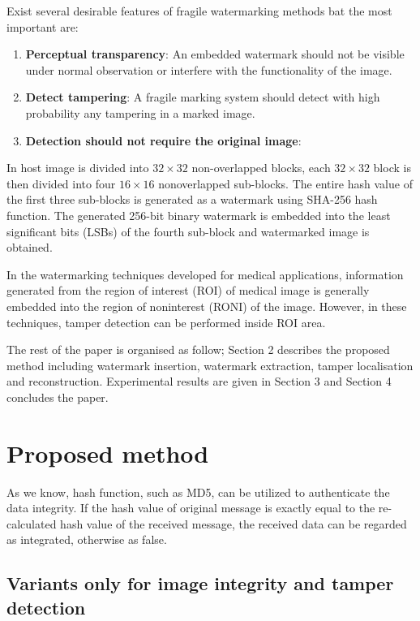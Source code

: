 \documentclass[runningheads]{llncs}
\begin{document}
Exist several desirable features of fragile watermarking methods bat the most important are:

\begin{enumerate}
	\item \textbf{Perceptual transparency}: An embedded watermark should not be visible under normal observation or interfere	with the functionality of the image.
	\item \textbf{Detect tampering}: A fragile marking system should detect with high probability any tampering in a marked image.
	\item \textbf{Detection should not require the original image}:
\end{enumerate}

In \cite{gul2019novel} host image is divided into $32\times 32$ non-overlapped blocks, each $32\times 32$ block is then divided into four $16\times 16$ nonoverlapped sub-blocks. The entire hash value of the first three sub-blocks is generated as a watermark using SHA-256 hash function. The generated 256-bit binary watermark is embedded into the least significant bits (LSBs) of the fourth sub-block and watermarked image is obtained.

In the watermarking techniques developed for medical applications, information generated from the region of interest (ROI) of medical image is generally embedded into the region of noninterest (RONI) of the image. However, in these
techniques, tamper detection can be performed inside ROI area.

The rest of the paper is organised as follow; Section 2 describes the proposed method including watermark insertion, watermark extraction, tamper localisation and reconstruction. Experimental results are given in Section 3 and Section 4 concludes the paper.

\section{Proposed method}
As we know, hash function, such as MD5, can be utilized to authenticate the data integrity. If the hash value of original message is exactly equal to the re-calculated hash value of the received message, the received data can be regarded as integrated, otherwise as false.

\subsection{Variants only for image integrity and tamper detection}
\end{document}
